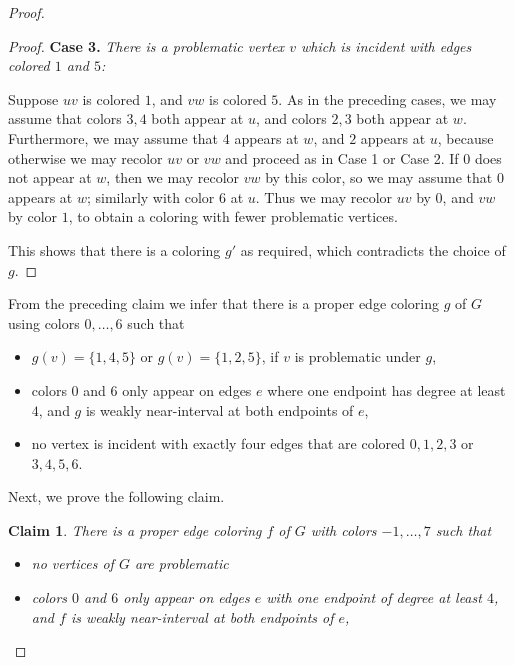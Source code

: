 \documentclass[10pt,a4paper]{amsart}
\newtheorem{claim}{Claim}
\begin{document}
\begin{proof}
\begin{proof}
	\bigskip

	{\bf Case 3.}	 {\em There is a problematic vertex $v$ which is incident with edges colored $1$ and $5$:}
	
	Suppose $uv$ is colored $1$, and $vw$ is colored $5$. As in the preceding cases, we may assume that
	colors $3,4$ both appear at $u$, and colors $2,3$ both appear at $w$. Furthermore, we may
	assume that $4$ appears at $w$, and $2$ appears at $u$, because otherwise we may recolor $uv$
	or $vw$ and proceed as in Case 1 or Case 2. If $0$ does not appear at $w$, then we may recolor $vw$
	by this color, so we may assume that $0$ appears at $w$; similarly with color $6$ at $u$.
	Thus we may recolor $uv$ by $0$, and $vw$ by color $1$, to obtain a coloring with fewer
	problematic vertices.

	\bigskip
	
	This shows that there is a coloring $g'$ as required, which contradicts the choice of $g$. 
\end{proof}


	From the preceding claim we infer that
	there is a proper edge coloring $g$ of $G$ using colors $0,\dots, 6$ such that
\begin{itemize}

	\item $g(v)=\{1,4,5\}$ or $g(v)=\{1,2,5\}$, if $v$ is problematic under $g$,

	\item colors $0$ and $6$ only appear on edges $e$ where one endpoint has degree at least $4$, and $g$
	is weakly near-interval at both endpoints of $e$,

	\item no vertex is incident with exactly four edges that are colored $0,1,2,3$ or $3,4,5,6$.

\end{itemize}

	Next, we prove the following claim.


\begin{claim}
\label{cl:prob3}
	There is a proper edge coloring $f$ of $G$ with colors $-1, \dots, 7$ such that
\begin{itemize}
	\item[(i)] no vertices of $G$ are problematic

	\item[(ii)] colors $0$ and $6$ only appear on edges $e$ with one endpoint of degree at least $4$, 
	and $f$ is weakly near-interval at both endpoints of $e$, 


\end{itemize}
\end{claim}
\end{proof}
\end{document}
